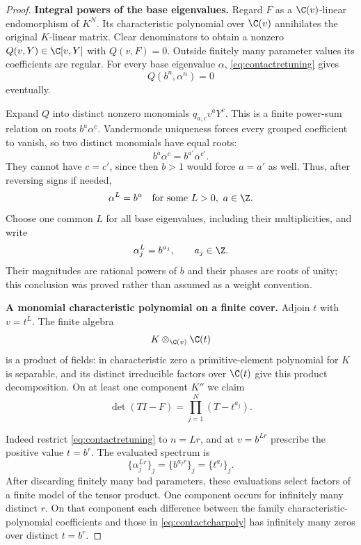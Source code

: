 \begin{proof}
\par\smallskip\noindent\textbf{Integral powers of the base eigenvalues.}\quad
Regard $F$ as a $\C(v)$-linear endomorphism of $K^N$.
Its characteristic polynomial over $\C(v)$ annihilates
the original $K$-linear matrix. Clear denominators to
obtain a nonzero $Q(v,Y)\in\C[v,Y]$ with $Q(v,F)=0$.
Outside finitely many parameter values its coefficients
are regular. For every base eigenvalue $\alpha$,
\eqref{eq:contactretuning} gives
\[
 Q(b^n,\alpha^n)=0
\]
eventually.

Expand $Q$ into distinct nonzero monomials
$q_{a,c}v^aY^c$. This is a finite power-sum relation
on roots $b^a\alpha^c$.
Vandermonde uniqueness forces every grouped coefficient
to vanish, so two distinct monomials have equal roots:
\[
 b^a\alpha^c=b^{a'}\alpha^{c'}.
\]
They cannot have $c=c'$, since then $b>1$ would force
$a=a'$ as well. Thus, after reversing signs if needed,
\[
 \alpha^L=b^a\quad\hbox{for some }L>0,\ a\in\Z.
\]
Choose one common $L$ for all base eigenvalues, including
their multiplicities, and write
\begin{equation}\label{eq:contactbasecharacters}
 \alpha_j^L=b^{a_j},\qquad a_j\in\Z.
\end{equation}
Their magnitudes are rational powers of $b$ and their
phases are roots of unity; this conclusion was proved
rather than assumed as a weight convention.

\par\smallskip\noindent\textbf{A monomial characteristic polynomial on a finite cover.}\quad
Adjoin $t$ with $v=t^L$.
The finite algebra
\[
 K\otimes_{\C(v)}\C(t)
\]
is a product of fields: in characteristic zero a
primitive-element polynomial for $K$ is separable,
and its distinct irreducible factors over $\C(t)$
give this product decomposition.
On at least one component $K''$ we claim
\begin{equation}\label{eq:contactcharpoly}
 \det(TI-F)=\prod_{j=1}^N(T-t^{a_j}).
\end{equation}

Indeed restrict \eqref{eq:contactretuning} to $n=Lr$,
and at $v=b^{Lr}$ prescribe the positive value $t=b^r$.
The evaluated spectrum is
\[
 \{\alpha_j^{Lr}\}_j=\{b^{a_jr}\}_j
                  =\{t^{a_j}\}_j.
\]
After discarding finitely many bad parameters, these
evaluations select factors of a finite model of the
tensor product. One component occurs for infinitely
many distinct $r$.
On that component each difference between the family
characteristic-polynomial coefficients and those
in \eqref{eq:contactcharpoly} has infinitely many zeros
over distinct $t=b^r$.


\end{proof}
